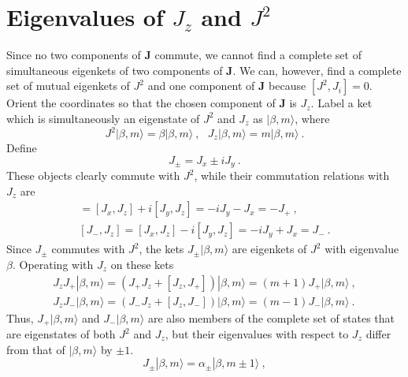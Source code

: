 \documentclass[12pt,a4paper]{article}
\renewcommand{\vec}[1]{\boldsymbol{#1}}
\begin{document}
\section{Eigenvalues of $J_z$ and $J^2$}
\cite{binney2013physics} Since no two components of $\vec{J}$ commute, we cannot find a complete set of simultaneous eigenkets of two components of $\vec{J}$. We can, however, find a complete set of mutual eigenkets of $J^2$ and one component of $\vec{J}$ because $[J^2, J_i] = 0$. Orient the coordinates so that the chosen component of $\vec{J}$ is $J_z$. Label a ket which is simultaneously an eigenstate of $J^2$ and $J_z$ as $|\beta, m\rangle$, where
\begin{equation}
J^2 |\beta, m \rangle  = \beta  |\beta, m \rangle ~, ~~~ J_z |\beta, m \rangle = m |\beta, m \rangle ~.
\end{equation}
Define 
\begin{equation}
J_\pm = J_x \pm i J_y ~.
\end{equation}
These objects clearly commute with $J^2$, while their commutation relations with $J_z$ are
\begin{align}
[J_+, J_z] = [J_x, J_z] +i[J_y, J_z] = -iJ_y -J_x  = -J_+ ~, \\
[J_-, J_z] = [J_x, J_z] -i[J_y, J_z] = -iJ_y +J_x  = J_- ~.
\end{align}
Since $J_\pm$ commutes with $J^2$, the kets $J_\pm |\beta, m\rangle$ are eigenkets of $J^2$ with eigenvalue $\beta$. Operating with $J_z$ on these kets 
\begin{align}
J_z J_+ |\beta, m\rangle = (J_+ J_z +[J_z, J_+]) |\beta, m\rangle = (m+1) J_+ |\beta, m\rangle ~, \\
J_z J_- |\beta, m\rangle = (J_- J_z +[J_z, J_-]) |\beta, m\rangle = (m-1) J_- |\beta, m\rangle ~.
\end{align}
Thus, $J_+ |\beta, m\rangle$ and $J_- |\beta, m\rangle$ are also members of the complete set of states that are eigenstates of both $J^2$ and $J_z$, but their eigenvalues with respect to $J_z$ differ from that of $|\beta, m\rangle$ by $\pm 1$. 
\begin{equation}
J_\pm |\beta, m\rangle = \alpha_\pm |\beta, m\pm 1\rangle ~,
\end{equation}
\end{document}
